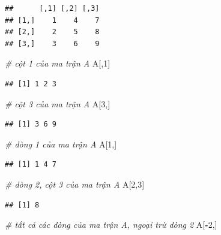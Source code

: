 \documentclass[
]{book}
\newenvironment{Shaded}{\begin{snugshade}}{\end{snugshade}}
\newcommand{\CommentTok}[1]{\textcolor[rgb]{0.56,0.35,0.01}{\textit{#1}}}
\newcommand{\DecValTok}[1]{\textcolor[rgb]{0.00,0.00,0.81}{#1}}
\newcommand{\NormalTok}[1]{#1}
\newcommand{\OperatorTok}[1]{\textcolor[rgb]{0.81,0.36,0.00}{\textbf{#1}}}
\begin{document}
\begin{verbatim}
##      [,1] [,2] [,3]
## [1,]    1    4    7
## [2,]    2    5    8
## [3,]    3    6    9
\end{verbatim}

\begin{Shaded}
\begin{Highlighting}[]
\CommentTok{\# cột 1 của ma trận A}
\NormalTok{A[,}\DecValTok{1}\NormalTok{]}
\end{Highlighting}
\end{Shaded}

\begin{verbatim}
## [1] 1 2 3
\end{verbatim}

\begin{Shaded}
\begin{Highlighting}[]
\CommentTok{\# cột 3 của ma trận A}
\NormalTok{A[}\DecValTok{3}\NormalTok{,]}
\end{Highlighting}
\end{Shaded}

\begin{verbatim}
## [1] 3 6 9
\end{verbatim}

\begin{Shaded}
\begin{Highlighting}[]
\CommentTok{\# dòng 1 của ma trận A}
\NormalTok{A[}\DecValTok{1}\NormalTok{,]}
\end{Highlighting}
\end{Shaded}

\begin{verbatim}
## [1] 1 4 7
\end{verbatim}

\begin{Shaded}
\begin{Highlighting}[]
\CommentTok{\# dòng 2, cột 3 của ma trận A}
\NormalTok{A[}\DecValTok{2}\NormalTok{,}\DecValTok{3}\NormalTok{]}
\end{Highlighting}
\end{Shaded}

\begin{verbatim}
## [1] 8
\end{verbatim}

\begin{Shaded}
\begin{Highlighting}[]
\CommentTok{\# tất cả các dòng của ma trận A, ngoại trừ dòng 2}
\NormalTok{A[}\OperatorTok{{-}}\DecValTok{2}\NormalTok{,]}
\end{Highlighting}
\end{Shaded}
\end{document}
